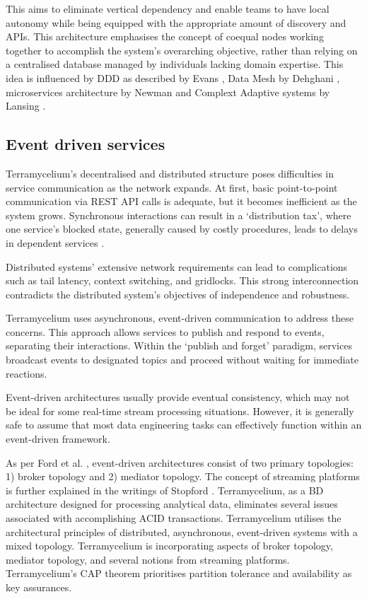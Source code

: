 \documentclass[review]{elsarticle}
\begin{document}
This aims to eliminate vertical dependency and enable teams to have local autonomy while being equipped with the appropriate amount of discovery and APIs. This architecture emphasises the concept of coequal nodes working together to accomplish the system's overarching objective, rather than relying on a centralised database managed by individuals lacking domain expertise. This idea is influenced by DDD as described by Evans \cite{evans2004domain}, Data Mesh by Dehghani \cite{DataMesh}, microservices architecture by Newman \cite{newman2021building} and Complext Adaptive systems by Lansing \cite{lansing2003complex}. 

\subsection{Event driven services}

Terramycelium's decentralised and distributed structure poses difficulties in service communication as the network expands. At first, basic point-to-point communication via REST API calls is adequate, but it becomes inefficient as the system grows. Synchronous interactions can result in a `distribution tax', where one service's blocked state, generally caused by costly procedures, leads to delays in dependent services \cite{montesi2016circuit}.

Distributed systems' extensive network requirements can lead to complications such as tail latency, context switching, and gridlocks. This strong interconnection contradicts the distributed system's objectives of independence and robustness.

Terramycelium uses asynchronous, event-driven communication to address these concerns. This approach allows services to publish and respond to events, separating their interactions. Within the `publish and forget' paradigm, services broadcast events to designated topics and proceed without waiting for immediate reactions.

Event-driven architectures usually provide eventual consistency, which may not be ideal for some real-time stream processing situations. However, it is generally safe to assume that most data engineering tasks can effectively function within an event-driven framework.

As per Ford et al. \cite{Ford2021SoftwareArchitecture}, event-driven architectures consist of two primary topologies: 1) broker topology and 2) mediator topology. The concept of streaming platforms is further explained in the writings of Stopford \cite{stopford2018designing}. Terramycelium, as a BD architecture designed for processing analytical data, eliminates several issues associated with accomplishing ACID transactions. Terramycelium utilises the architectural principles of distributed, asynchronous, event-driven systems with a mixed topology. Terramycelium is incorporating aspects of broker topology, mediator topology, and several notions from streaming platforms. Terramycelium's CAP theorem \cite{simon2000brewer} prioritises partition tolerance and availability as key assurances. 
\end{document}
